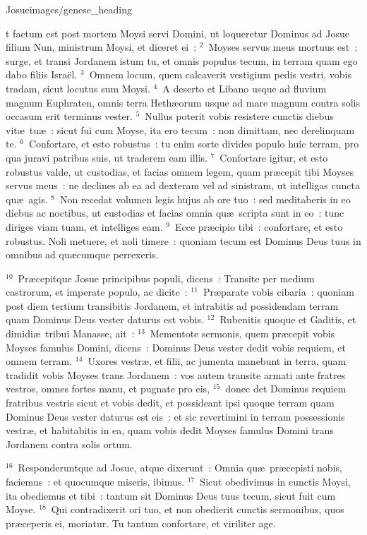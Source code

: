 {Josue}{images/genese_heading}


\bchapter
{}t factum est post mortem Moysi servi Domini, ut loqueretur Dominus ad Josue filium Nun, ministrum Moysi, et diceret ei~:
${}^{2}$~Moyses servus meus mortuus est~: surge, et transi Jordanem istum tu, et omnis populus tecum, in terram quam ego dabo filiis Isra\"el.
${}^{3}$~Omnem locum, quem calcaverit vestigium pedis vestri, vobis tradam, sicut locutus sum Moysi.
${}^{4}$~A deserto et Libano usque ad fluvium magnum Euphraten, omnis terra Heth\ae orum usque ad mare magnum contra solis occasum erit terminus vester.
${}^{5}$~Nullus poterit vobis resistere cunctis diebus vit\ae\ tu\ae~: sicut fui cum Moyse, ita ero tecum~: non dimittam, nec derelinquam te.
${}^{6}$~Confortare, et esto robustus~: tu enim sorte divides populo huic terram, pro qua juravi patribus suis, ut traderem eam illis.
${}^{7}$~Confortare igitur, et esto robustus valde, ut custodias, et facias omnem legem, quam pr\ae cepit tibi Moyses servus meus~: ne declines ab ea ad dexteram vel ad sinistram, ut intelligas cuncta qu\ae\ agis.
${}^{8}$~Non recedat volumen legis hujus ab ore tuo~: sed meditaberis in eo diebus ac noctibus, ut custodias et facias omnia qu\ae\ scripta sunt in eo~: tunc diriges viam tuam, et intelliges eam.
${}^{9}$~Ecce pr\ae cipio tibi~: confortare, et esto robustus. Noli metuere, et noli timere~: quoniam tecum est Dominus Deus tuus in omnibus ad qu\ae cumque perrexeris.


${}^{10}$~Pr\ae cepitque Josue principibus populi, dicens~: Transite per medium castrorum, et imperate populo, ac dicite~:
${}^{11}$~Pr\ae parate vobis cibaria~: quoniam post diem tertium transibitis Jordanem, et intrabitis ad possidendam terram quam Dominus Deus vester daturus est vobis.
${}^{12}$~Rubenitis quoque et Gaditis, et dimidi\ae\ tribui Manasse, ait~:
${}^{13}$~Mementote sermonis, quem pr\ae cepit vobis Moyses famulus Domini, dicens~: Dominus Deus vester dedit vobis requiem, et omnem terram.
${}^{14}$~Uxores vestr\ae , et filii, ac jumenta manebunt in terra, quam tradidit vobis Moyses trans Jordanem~: vos autem transite armati ante fratres vestros, omnes fortes manu, et pugnate pro eis,
${}^{15}$~donec det Dominus requiem fratribus vestris sicut et vobis dedit, et possideant ipsi quoque terram quam Dominus Deus vester daturus est eis~: et sic revertimini in terram possessionis vestr\ae , et habitabitis in ea, quam vobis dedit Moyses famulus Domini trans Jordanem contra solis ortum.


${}^{16}$~Responderuntque ad Josue, atque dixerunt~: Omnia qu\ae\ pr\ae cepisti nobis, faciemus~: et quocumque miseris, ibimus.
${}^{17}$~Sicut obedivimus in cunctis Moysi, ita obediemus et tibi~: tantum sit Dominus Deus tuus tecum, sicut fuit cum Moyse.
${}^{18}$~Qui contradixerit ori tuo, et non obedierit cunctis sermonibus, quos pr\ae ceperis ei, moriatur. Tu tantum confortare, et viriliter age.

